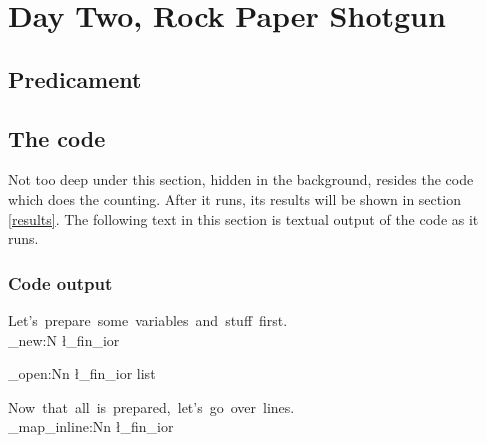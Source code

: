 \documentclass[]{article}
\begin{document}
    
  \section{Day Two, Rock Paper Shotgun}

    \subsection{Predicament}

    \subsection{The code}

      Not too deep under this section, hidden in the background, resides the code which does the counting. After it runs, its results will be shown in section \ref{results}. The following text in this section is textual output of the code as it runs.

      \subsubsection{Code output}

        \ExplSyntaxOn

        Let's~prepare~some~variables~and~stuff~first.\newline\\

          \ior_new:N \l_fin_ior

          \ior_open:Nn \l_fin_ior {list}



        Now~that~all~is~prepared,~let's~go~over~lines.\newline\\

          \ior_map_inline:Nn \l_fin_ior {}

        \ExplSyntaxOff
\end{document}
